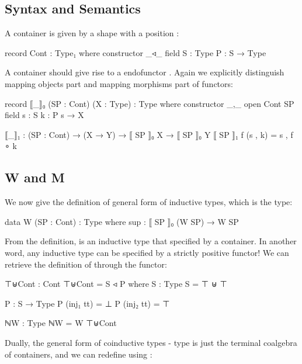 \subsection{Syntax and Semantics}

A container is given by a shape  \AgdaSymbol{:}  with a position  \AgdaSymbol{:}   :

\begin{code}
record Cont : Type₁ where
  constructor _◃_
  field
    S : Type
    P : S → Type
\end{code}

A container should give rise to a endofunctor   . Again we explicitly distinguish mapping objects part and mapping morphisms part of functors:

\begin{code}
record ⟦_⟧₀ (SP : Cont) (X : Type) : Type where
  constructor _,_
  open Cont SP
  field
    s : S
    k : P s → X

⟦_⟧₁ : (SP : Cont) → (X → Y) → ⟦ SP ⟧₀ X → ⟦ SP ⟧₀ Y
⟦ SP ⟧₁ f (s , k) = s , f ∘ k
\end{code}

\subsection{W and M}

We now give the definition of general form of inductive types, which is the  type:

\begin{code}
data W (SP : Cont) : Type where
  sup : ⟦ SP ⟧₀ (W SP) → W SP
\end{code}

From the definition,  is an inductive type that specified by a container. In another word, any inductive type can be specified by a strictly positive functor! We can retrieve the definition of  through the  functor:

\begin{code}
⊤⊎Cont : Cont
⊤⊎Cont = S ◃ P
  where
  S : Type
  S = ⊤ ⊎ ⊤

  P : S → Type
  P (inj₁ tt) = ⊥
  P (inj₂ tt) = ⊤

ℕW : Type
ℕW = W ⊤⊎Cont
\end{code}

Dually, the general form of coinductive types -  type is just the terminal coalgebra of containers, and we can redefine  using :

